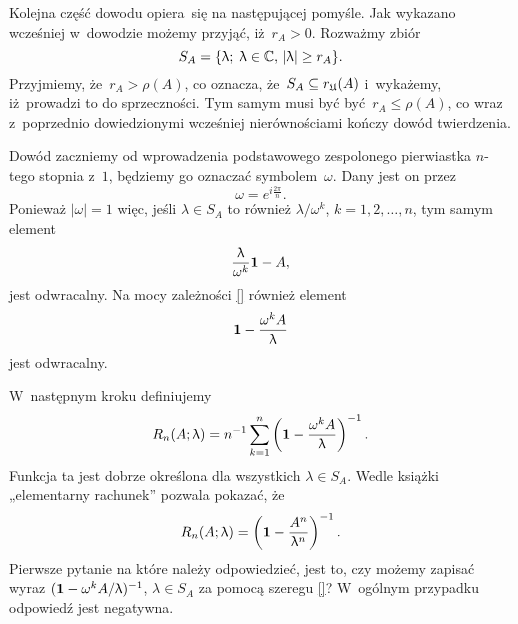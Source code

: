 \documentclass[a4paper,11pt]{article}
\begin{document}
Kolejna część dowodu opiera~się na następującej pomyśle. Jak wykazano
wcześniej w~dowodzie możemy przyjąć, iż~$r_{ A } > 0$. Rozważmy zbiór
\begin{equation}
  \label{eq:Bratteli-Robinson-Operator-Algebras-ETC-Vol-I-s01-40}
  S_{ A } =
  \{ \uplambda; \; \uplambda \in \mathbb{C}, \, | \uplambda | \geq r_{ A } \}.
\end{equation}
Przyjmiemy, że~$r_{ A } > \rho( A )$, co oznacza, że~$S_{ A } \subseteq r_{ \mathfrak{U} }( A )$
i~wykażemy, iż~prowadzi to do sprzeczności. Tym samym musi być
być~$r_{ A } \leq \rho( A )$, co wraz z~poprzednio dowiedzionymi wcześniej
nierównościami kończy dowód twierdzenia.

Dowód zaczniemy od wprowadzenia podstawowego zespolonego pierwiastka
$n$-tego stopnia z~$1$, będziemy go oznaczać symbolem~$\omega$. Dany jest on przez
\begin{equation}
  \label{eq:Bratteli-Robinson-Operator-Algebras-ETC-Vol-I-s01-41}
  \omega = e^{ i \frac{ 2 \pi }{ n } }.
\end{equation}
Ponieważ $| \omega | = 1$ więc, jeśli $\lambda \in S_{ A }$ to również
$\lambda / \omega^{ k }$, $k = 1, 2, \ldots, n$, tym samym element
\begin{equation}
  \label{eq:Bratteli-Robinson-Operator-Algebras-ETC-Vol-I-s01-42}
  \frac{ \uplambda }{ \omega^{ k } } \mathbf{1} - A,
\end{equation}
jest odwracalny. Na mocy zależności \eqref{} również element
\begin{equation}
  \label{eq:Bratteli-Robinson-Operator-Algebras-ETC-Vol-I-s01-43}
  \mathbf{1} - \frac{ \omega^{ k } A }{ \uplambda }
\end{equation}
jest odwracalny.

W~następnym kroku definiujemy
\begin{equation}
  \label{eq:Bratteli-Robinson-Operator-Algebras-ETC-Vol-I-s01-44}
  R_{ n }( A; \uplambda ) =
  n^{ -1 } \sum_{ k = 1 }^{ n } \left( \mathbf{1} -
    \frac{ \omega^{ k } A }{ \uplambda } \right)^{ -1 }.
\end{equation}
Funkcja ta jest dobrze określona dla wszystkich $\lambda \in S_{ A }$. Wedle książki
„elementarny rachunek” pozwala pokazać, że
\begin{equation}
  \label{eq:Bratteli-Robinson-Operator-Algebras-ETC-Vol-I-s01-45}
  R_{ n }( A; \uplambda ) =
  \left( \mathbf{1} - \frac{ A^{ n } }{ \uplambda^{ n } } \right)^{ -1 }.
\end{equation}
Pierwsze pytanie na które należy odpowiedzieć, jest to, czy możemy zapisać
wyraz $( \mathbf{1} - \omega^{ k } A / \uplambda )^{ -1 }$, $\lambda \in S_{ A }$ za pomocą szeregu
\eqref{}? W~ogólnym przypadku odpowiedź jest negatywna.
\end{document}
